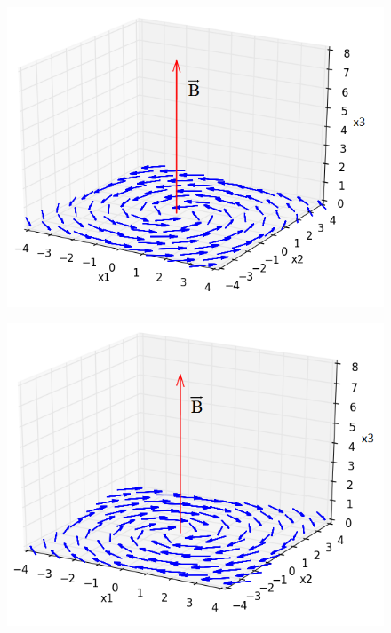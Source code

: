 \documentclass[11pt,letterpaper]{article}     %
\begin{document}
\begin{figure}
\centering
\begin{minipage}{.5\textwidth}
  \centering
  \includegraphics[width=1\linewidth]{img/figure_2}
  \label{fig:test1}
\end{minipage}%
\begin{minipage}{.5\textwidth}
  \centering
  \includegraphics[width=1\linewidth]{img/figure_3}
  \label{fig:test2}
\end{minipage}
\end{figure}
\end{document}
